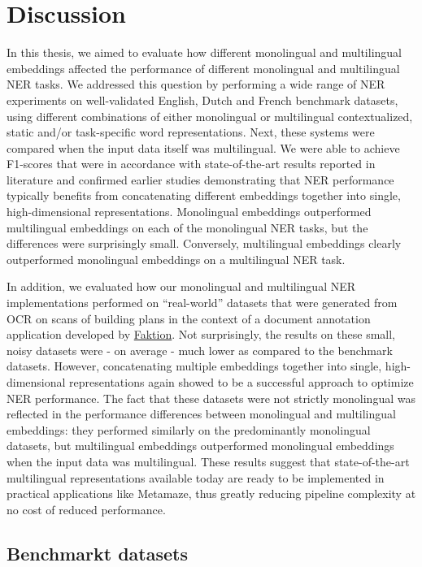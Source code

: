 \documentclass[12pt,a4paper,]{book}
\begin{document}
\hypertarget{discussion}{%
\chapter{Discussion}\label{discussion}}

In this thesis, we aimed to evaluate how different monolingual and multilingual embeddings affected the performance of different monolingual and multilingual NER tasks. We addressed this question by performing a wide range of NER experiments on well-validated English, Dutch and French benchmark datasets, using different combinations of either monolingual or multilingual contextualized, static and/or task-specific word representations. Next, these systems were compared when the input data itself was multilingual. We were able to achieve F1-scores that were in accordance with state-of-the-art results reported in literature and confirmed earlier studies demonstrating that NER performance typically benefits from concatenating different embeddings together into single, high-dimensional representations. Monolingual embeddings outperformed multilingual embeddings on each of the monolingual NER tasks, but the differences were surprisingly small. Conversely, multilingual embeddings clearly outperformed monolingual embeddings on a multilingual NER task.

In addition, we evaluated how our monolingual and multilingual NER implementations performed on ``real-world'' datasets that were generated from OCR on scans of building plans in the context of a document annotation application developed by \href{https://www.faktion.com/}{Faktion}. Not surprisingly, the results on these small, noisy datasets were - on average - much lower as compared to the benchmark datasets. However, concatenating multiple embeddings together into single, high-dimensional representations again showed to be a successful approach to optimize NER performance. The fact that these datasets were not strictly monolingual was reflected in the performance differences between monolingual and multilingual embeddings: they performed similarly on the predominantly monolingual datasets, but multilingual embeddings outperformed monolingual embeddings when the input data was multilingual. These results suggest that state-of-the-art multilingual representations available today are ready to be implemented in practical applications like Metamaze, thus greatly reducing pipeline complexity at no cost of reduced performance.

\hypertarget{benchmarkt-datasets}{%
\section{Benchmarkt datasets}\label{benchmarkt-datasets}}
\end{document}

